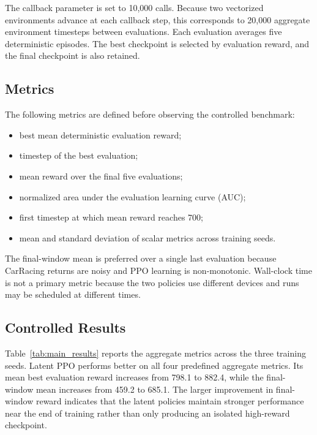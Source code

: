 \documentclass[10pt,twocolumn,a4paper]{article}
\begin{document}
The callback parameter is set to 10,000 calls. Because two vectorized
environments advance at each callback step, this corresponds to 20,000 aggregate
environment timesteps between evaluations. Each evaluation averages five
deterministic episodes. The best checkpoint is selected by evaluation reward,
and the final checkpoint is also retained.

\subsection{Metrics}

The following metrics are defined before observing the controlled benchmark:

\begin{itemize}
  \item best mean deterministic evaluation reward;
  \item timestep of the best evaluation;
  \item mean reward over the final five evaluations;
  \item normalized area under the evaluation learning curve (AUC);
  \item first timestep at which mean reward reaches 700;
  \item mean and standard deviation of scalar metrics across training seeds.
\end{itemize}

The final-window mean is preferred over a single last evaluation because
CarRacing returns are noisy and PPO learning is non-monotonic. Wall-clock time is
not a primary metric because the two policies use different devices and runs may
be scheduled at different times.

\subsection{Controlled Results}

Table~\ref{tab:main_results} reports the aggregate metrics across the three
training seeds. Latent PPO performs better on all four predefined aggregate
metrics. Its mean best evaluation reward increases from 798.1 to 882.4, while
the final-window mean increases from 459.2 to 685.1. The larger improvement in
final-window reward indicates that the latent policies maintain stronger
performance near the end of training rather than only producing an isolated
high-reward checkpoint.
\end{document}
